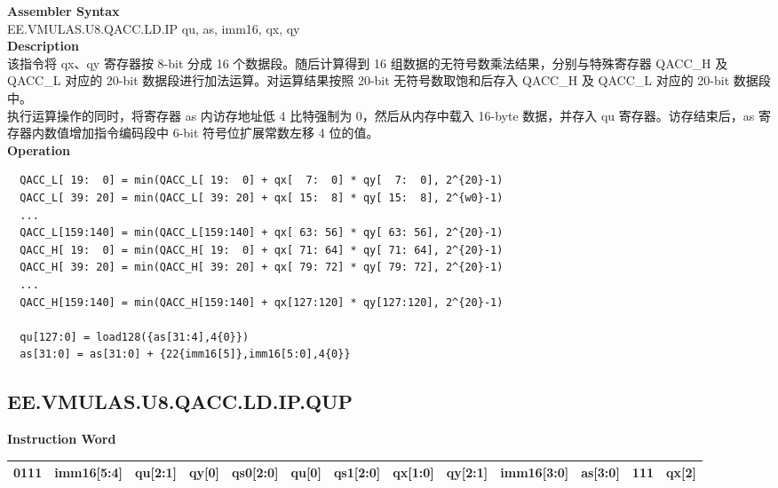 \textbf{Assembler Syntax} \\
EE.VMULAS.U8.QACC.LD.IP qu, as, imm16, qx, qy \\
\textbf{Description} \\
该指令将 qx、qy 寄存器按 8-bit 分成 16 个数据段。随后计算得到 16 组数据的无符号数乘法结果，分别与特殊寄存器 QACC\_H 及 QACC\_L 对应的 20-bit 数据段进行加法运算。对运算结果按照 20-bit 无符号数取饱和后存入 QACC\_H 及 QACC\_L 对应的 20-bit 数据段中。\\
执行运算操作的同时，将寄存器 as 内访存地址低 4 比特强制为 0，然后从内存中载入 16-byte 数据，并存入 qu 寄存器。访存结束后，as 寄存器内数值增加指令编码段中 6-bit 符号位扩展常数左移 4 位的值。\\
\textbf{Operation}
\begin{lstlisting}
  QACC_L[ 19:  0] = min(QACC_L[ 19:  0] + qx[  7:  0] * qy[  7:  0], 2^{20}-1)
  QACC_L[ 39: 20] = min(QACC_L[ 39: 20] + qx[ 15:  8] * qy[ 15:  8], 2^{w0}-1)
  ...
  QACC_L[159:140] = min(QACC_L[159:140] + qx[ 63: 56] * qy[ 63: 56], 2^{20}-1)
  QACC_H[ 19:  0] = min(QACC_H[ 19:  0] + qx[ 71: 64] * qy[ 71: 64], 2^{20}-1)
  QACC_H[ 39: 20] = min(QACC_H[ 39: 20] + qx[ 79: 72] * qy[ 79: 72], 2^{20}-1)
  ...
  QACC_H[159:140] = min(QACC_H[159:140] + qx[127:120] * qy[127:120], 2^{20}-1)

  qu[127:0] = load128({as[31:4],4{0}})
  as[31:0] = as[31:0] + {22{imm16[5]},imm16[5:0],4{0}}
\end{lstlisting}

\clearpage
\subsection{EE.VMULAS.U8.QACC.LD.IP.QUP}\label{instruction:EEVMULASU8QACCLDIPQUP}
\setlength\tabcolsep{5pt}
\textbf{Instruction Word} \\
\begin{tabular}{|c|c|c|c|c|c|c|c|c|c|c|c|c|}
	\hline
	0111 & imm16[5:4] & qu[2:1] & qy[0] & qs0[2:0] & qu[0] & qs1[2:0] & qx[1:0] & qy[2:1] & imm16[3:0] & as[3:0] & 111 & qx[2] \\
	\hline
\end{tabular}

